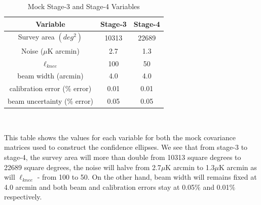 \begin{table}[h]
\centering
\caption{Mock Stage-3 and Stage-4 Variables}

\label{table: stage-stats}
\begin{tabular}{l|l|l}
\multicolumn{1}{c}{Variable} & \multicolumn{1}{|c}{Stage-3} & \multicolumn{1}{|c}{Stage-4} \\ \hline
\multicolumn{1}{c}{Survey area $(deg^2)$} & \multicolumn{1}{|c}{10313} & \multicolumn{1}{|c}{22689}  \\
\multicolumn{1}{c}{Noise ($\mu$K arcmin)} & \multicolumn{1}{|c}{2.7} & \multicolumn{1}{|c}{1.3}  \\
\multicolumn{1}{c}{$\ell_{knee}$} & \multicolumn{1}{|c}{100} & \multicolumn{1}{|c}{50} \\
\multicolumn{1}{c}{beam width (arcmin)} & \multicolumn{1}{|c}{4.0} & \multicolumn{1}{|c}{4.0}   \\
\multicolumn{1}{c}{calibration error (\% error)} & \multicolumn{1}{|c}{0.01} & \multicolumn{1}{|c}{0.01} \\
\multicolumn{1}{c}{beam uncertainty (\% error)} & \multicolumn{1}{|c}{0.05} & \multicolumn{1}{|c}{0.05}
\end{tabular}
\\
\begin{flushleft}
This table shows the values for each variable for both the mock covariance matrices used to construct the confidence ellipses. We see that from stage-3 to stage-4, the survey area will more than double from 10313 square degrees to 22689 square degrees, the noise will halve from 2.7$\mu$K arcmin to 1.3$\mu$K arcmin as will $\ell_{knee}$ - from 100 to 50. On the other hand, beam width will remains fixed at 4.0 arcmin and both beam and calibration errors stay at 0.05$\%$ and 0.01$\%$ respectively.
\end{flushleft}
\end{table}


